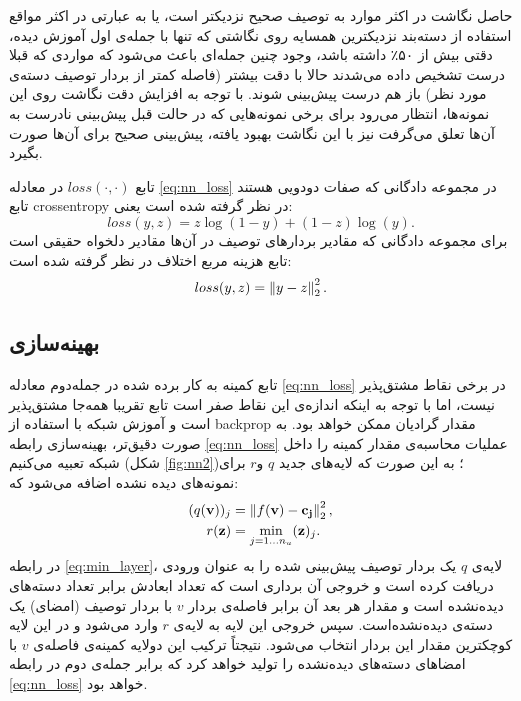  حاصل نگاشت در اکثر موارد به توصیف صحیح نزدیکتر است، یا به عبارتی در اکثر مواقع استفاده از دسته‌بند نزدیکترین همسایه روی نگاشتی که تنها با جمله‌ی اول آموزش دیده، دقتی بیش از ۵۰٪ داشته باشد، وجود چنین جمله‌ای باعث می‌شود که مواردی که قبلا درست تشخیص داده می‌شدند حالا با دقت بیشتر (فاصله کمتر از بردار توصیف دسته‌ی مورد نظر) باز هم درست پیش‌بینی شوند. با توجه به افزایش دقت نگاشت روی این نمونه‌ها، انتظار می‌رود برای برخی نمونه‌هایی که در حالت قبل پیش‌بینی نادرست به آن‌ها تعلق می‌گرفت نیز با این نگاشت بهبود یافته، پیش‌بینی صحیح برای آن‌ها صورت بگیرد.

 تابع $loss(\cdot, \cdot)$ در معادله \eqref{eq:nn_loss} در مجموعه دادگانی که صفات دودویی هستند تابع \gls{crossentropy} در نظر گرفته شده است یعنی:
 \begin{equation}
 loss(y,z) = z \log(1-y) + (1-z) \log(y).
 \end{equation}
 برای مجموعه دادگانی که مقادیر بردارهای توصیف در آن‌ها مقادیر دلخواه حقیقی است تابع هزینه مربع اختلاف در نظر گرفته شده است:
 \begin{equation}
 loss(y,z) = \left \lVert y-z \right \rVert_2^2.
 \end{equation}
 \subsection{بهینه‌سازی }\label{opt_nn}

 تابع کمینه به کار برده شده در جمله‌دوم معادله
\eqref{eq:nn_loss}
در برخی نقاط مشتق‌پذیر نیست، اما با توجه به اینکه اندازه‌ی این نقاط صفر است تابع تقریبا همه‌جا مشتق‌پذیر است و آموزش شبکه با استفاده از \gls{backprop}
 مقدار گرادیان ممکن خواهد بود. به صورت دقیق‌تر، بهینه‌سازی رابطه \eqref{eq:nn_loss} عملیات محاسبه‌ی مقدار کمینه را داخل شبکه تعبیه می‌کنیم (شکل \ref{fig:nn2})؛ به این صورت که لایه‌های جدید $q$ و$r$ برای نمونه‌های دیده نشده اضافه می‌شود که:
\begin{align}
\label{eq:min_layer}
(q(\mathbf{v}))_j &=  \left \lVert f(\mathbf{v) - c_j} \right \rVert_2^2, \\
r(\mathbf{z}) &= \min_{j=1\ldots n_u} (\mathbf{z})_j.
\end{align}
در رابطه \eqref{eq:min_layer}، لایه‌ی $q$ یک بردار توصیف پیش‌بینی شده را به عنوان ورودی دریافت کرده است و خروجی آن برداری است که تعداد ابعادش برابر تعداد دسته‌های دیده‌نشده است و مقدار هر بعد آن برابر فاصله‌ی بردار $v$ با بردار توصیف (امضای) یک دسته‌ی دیده‌نشده‌است.
 سپس خروجی این لایه به لایه‌ی $r$ وارد می‌شود و در این لایه کوچکترین مقدار این بردار انتخاب می‌شود. نتیجتاً ترکیب این دولایه کمینه‌ی فاصله‌ی $v$ با امضاهای دسته‌های دیده‌نشده را تولید خواهد کرد که برابر جمله‌ی دوم در رابطه \eqref{eq:nn_loss} خواهد بود.

